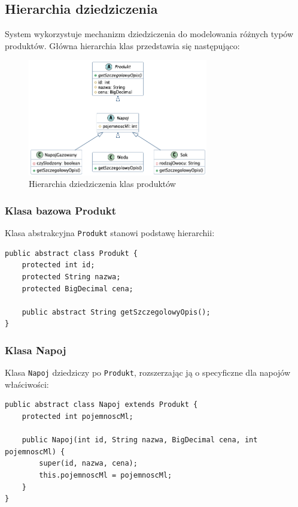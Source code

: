 \subsection{Hierarchia dziedziczenia}
System wykorzystuje mechanizm dziedziczenia do modelowania różnych typów produktów. Główna hierarchia klas przedstawia się następująco:

\begin{figure}[H]
\centering
\includegraphics[width=0.7\textwidth]{figures/inheritance_diagram.png}
\caption{Hierarchia dziedziczenia klas produktów}
\label{fig:inheritance_diagram}
\end{figure}

\subsubsection{Klasa bazowa Produkt}
Klasa abstrakcyjna \texttt{Produkt} stanowi podstawę hierarchii:

\begin{lstlisting}[style=javaStyle]
public abstract class Produkt {
    protected int id;
    protected String nazwa;
    protected BigDecimal cena;
    
    public abstract String getSzczegolowyOpis();
}
\end{lstlisting}

\subsubsection{Klasa Napoj}
Klasa \texttt{Napoj} dziedziczy po \texttt{Produkt}, rozszerzając ją o specyficzne dla napojów właściwości:

\begin{lstlisting}[style=javaStyle]
public abstract class Napoj extends Produkt {
    protected int pojemnoscMl;
    
    public Napoj(int id, String nazwa, BigDecimal cena, int pojemnoscMl) {
        super(id, nazwa, cena);
        this.pojemnoscMl = pojemnoscMl;
    }
}
\end{lstlisting}

